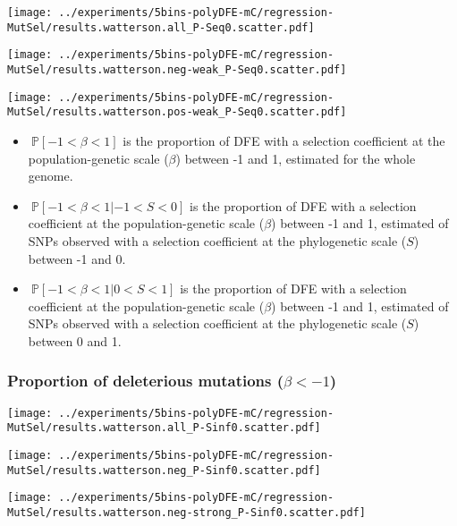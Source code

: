 \documentclass{article}
\newcommand{\proba}{\mathbb{P}}
\newcommand{\Sphy}{S}
\newcommand{\divWeakDel}{-1 < \Sphy < 0}
\newcommand{\divWeakAdv}{0 < \Sphy < 1}
\newcommand{\Spop}{\beta}
\newcommand{\polyDel}{\Spop < -1}
\newcommand{\polyNeutral}{-1 < \Spop < 1}
\begin{document}
    \begin{minipage}{0.32\linewidth}
        \texttt{[image: ../experiments/5bins-polyDFE-mC/regression-MutSel/results.watterson.all\_P-Seq0.scatter.pdf]}
    \end{minipage}
    \begin{minipage}{0.32\linewidth}
        \texttt{[image: ../experiments/5bins-polyDFE-mC/regression-MutSel/results.watterson.neg-weak\_P-Seq0.scatter.pdf]}
    \end{minipage}
    \begin{minipage}{0.32\linewidth}
        \texttt{[image: ../experiments/5bins-polyDFE-mC/regression-MutSel/results.watterson.pos-weak\_P-Seq0.scatter.pdf]}
    \end{minipage}

    \begin{itemize}
        \item $\ \proba [ \polyNeutral ]$ is the proportion of DFE with a selection coefficient at the population-genetic scale ($\Spop$) between -1 and 1, estimated for the whole genome.
        \item $\ \proba [ \polyNeutral | \divWeakDel]$ is the proportion of DFE with a selection coefficient at the population-genetic scale ($\Spop$) between -1 and 1, estimated of SNPs observed with a selection coefficient at the phylogenetic scale ($\Sphy$) between -1 and 0.
        \item $\ \proba [ \polyNeutral | \divWeakAdv ]$ is the proportion of DFE with a selection coefficient at the population-genetic scale ($\Spop$) between -1 and 1, estimated of SNPs observed with a selection coefficient at the phylogenetic scale ($\Sphy$) between 0 and 1.
    \end{itemize}

    \subsubsection{Proportion of deleterious mutations ($\polyDel$)}\label{subsec:proportion-deleterious-mutations}

    \begin{minipage}{0.32\linewidth}
        \texttt{[image: ../experiments/5bins-polyDFE-mC/regression-MutSel/results.watterson.all\_P-Sinf0.scatter.pdf]}
    \end{minipage}
    \begin{minipage}{0.32\linewidth}
        \texttt{[image: ../experiments/5bins-polyDFE-mC/regression-MutSel/results.watterson.neg\_P-Sinf0.scatter.pdf]}
    \end{minipage}
    \begin{minipage}{0.32\linewidth}
        \texttt{[image: ../experiments/5bins-polyDFE-mC/regression-MutSel/results.watterson.neg-strong\_P-Sinf0.scatter.pdf]}
    \end{minipage}
\end{document}
